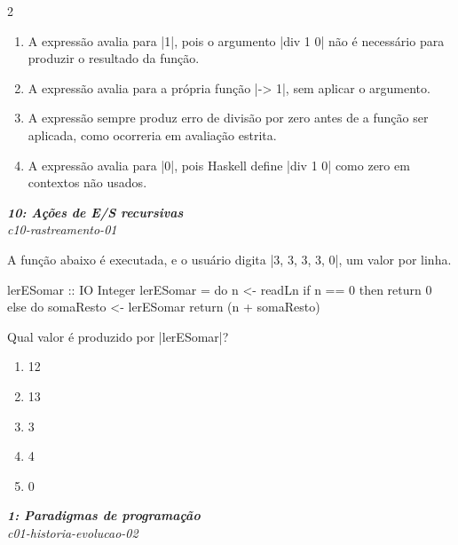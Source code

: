 \documentclass[a4paper,10pt,brazil]{article}
\begin{document}
\begin{multicols}{2}
\begin{enumerate}
  \item A expressão avalia para \haskellinline|1|, pois o argumento \haskellinline|div 1 0| não é necessário para produzir o resultado da função.

  \item A expressão avalia para a própria função \haskellinline|\x -> 1|, sem aplicar o argumento.

  \item A expressão sempre produz erro de divisão por zero antes de a função ser aplicada, como ocorreria em avaliação estrita.

  \item A expressão avalia para \haskellinline|0|, pois Haskell define \haskellinline|div 1 0| como zero em contextos não usados.


\end{enumerate}

\begin{flushright}
  \footnotesize
  \textit{\textbf{10: Ações de E/S recursivas}}\\
  \textit{c10-rastreamento-01}\\

\end{flushright}
A função abaixo é executada, e o usuário digita \haskellinline|3, 3, 3, 3, 0|, um valor por linha.

\begin{haskellcode}
lerESomar :: IO Integer
lerESomar = do
  n <- readLn
  if n == 0
    then return 0
    else do
      somaResto <- lerESomar
      return (n + somaResto)
\end{haskellcode}

Qual valor é produzido por \haskellinline|lerESomar|?

\begin{enumerate}
  \item 12

  \item 13

  \item 3

  \item 4

  \item 0


\end{enumerate}

\begin{flushright}
  \footnotesize
  \textit{\textbf{1: Paradigmas de programação}}\\
  \textit{c01-historia-evolucao-02}\\


\end{flushright}
\end{multicols}
\end{document}
